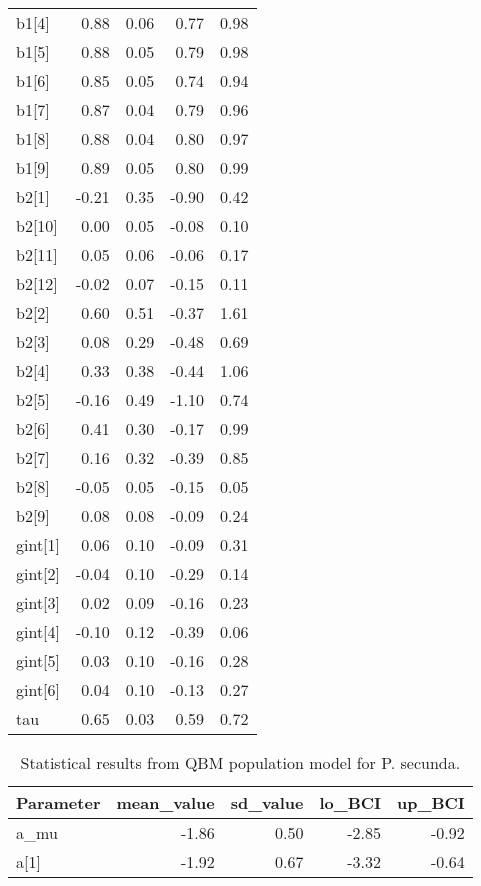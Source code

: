 \documentclass[12pt,]{article}
\begin{document}
\begin{table}[ht]
{\begin{tabular}{lrrrr}
  b1[4] & 0.88 & 0.06 & 0.77 & 0.98 \\ 
  b1[5] & 0.88 & 0.05 & 0.79 & 0.98 \\ 
  b1[6] & 0.85 & 0.05 & 0.74 & 0.94 \\ 
  b1[7] & 0.87 & 0.04 & 0.79 & 0.96 \\ 
  b1[8] & 0.88 & 0.04 & 0.80 & 0.97 \\ 
  b1[9] & 0.89 & 0.05 & 0.80 & 0.99 \\ 
  b2[1] & -0.21 & 0.35 & -0.90 & 0.42 \\ 
  b2[10] & 0.00 & 0.05 & -0.08 & 0.10 \\ 
  b2[11] & 0.05 & 0.06 & -0.06 & 0.17 \\ 
  b2[12] & -0.02 & 0.07 & -0.15 & 0.11 \\ 
  b2[2] & 0.60 & 0.51 & -0.37 & 1.61 \\ 
  b2[3] & 0.08 & 0.29 & -0.48 & 0.69 \\ 
  b2[4] & 0.33 & 0.38 & -0.44 & 1.06 \\ 
  b2[5] & -0.16 & 0.49 & -1.10 & 0.74 \\ 
  b2[6] & 0.41 & 0.30 & -0.17 & 0.99 \\ 
  b2[7] & 0.16 & 0.32 & -0.39 & 0.85 \\ 
  b2[8] & -0.05 & 0.05 & -0.15 & 0.05 \\ 
  b2[9] & 0.08 & 0.08 & -0.09 & 0.24 \\ 
  gint[1] & 0.06 & 0.10 & -0.09 & 0.31 \\ 
  gint[2] & -0.04 & 0.10 & -0.29 & 0.14 \\ 
  gint[3] & 0.02 & 0.09 & -0.16 & 0.23 \\ 
  gint[4] & -0.10 & 0.12 & -0.39 & 0.06 \\ 
  gint[5] & 0.03 & 0.10 & -0.16 & 0.28 \\ 
  gint[6] & 0.04 & 0.10 & -0.13 & 0.27 \\ 
  tau & 0.65 & 0.03 & 0.59 & 0.72 \\ 
   \hline
\end{tabular}
}
\end{table}\begin{table}[ht]
\centering
\caption{Statistical results from QBM population model for P. secunda.} 
{\footnotesize
\begin{tabular}{lrrrr}
  \hline
Parameter & mean\_value & sd\_value & lo\_BCI & up\_BCI \\ 
  \hline
a\_mu & -1.86 & 0.50 & -2.85 & -0.92 \\ 
  a[1] & -1.92 & 0.67 & -3.32 & -0.64 \\ 

\end{tabular}}
\end{table}
\end{document}
